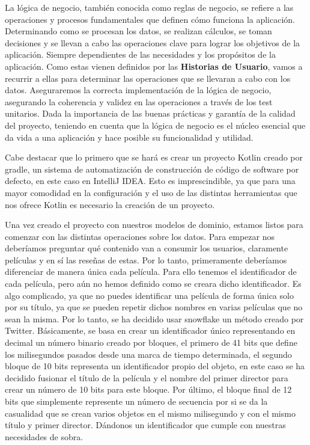 La lógica de negocio, también conocida como reglas de negocio, se refiere a las operaciones y procesos 
fundamentales que definen cómo funciona la aplicación. Determinando como se procesan los datos, se 
realizan cálculos, se toman decisiones y se llevan a cabo las operaciones clave para lograr los 
objetivos de la aplicación. Siempre dependientes de las necesidades y los propósitos de la aplicación. 
Como estas vienen definidos por las \textbf{Historias de Usuario}, vamos a recurrir a ellas para 
determinar las operaciones que se llevaran a cabo con los datos. Aseguraremos la correcta 
implementación de la lógica de negocio, asegurando la coherencia y validez en las operaciones a través 
de los test unitarios. Dada la importancia de las buenas prácticas y garantía de la calidad del 
proyecto, teniendo en cuenta que la lógica de negocio es el núcleo esencial que da vida a una 
aplicación y hace posible su funcionalidad y utilidad.

Cabe destacar que lo primero que se hará es crear un proyecto Kotlin creado por gradle, un sistema de 
automatización de construcción de código de software por defecto, en este caso en IntelliJ IDEA. Esto 
es imprescindible, ya que para una mayor comodidad en la configuración y el uso de las distintas 
herramientas que nos ofrece Kotlin es necesario la creación de un proyecto. 

Una vez creado el proyecto con nuestros modelos de dominio, estamos listos para comenzar con las 
distintas operaciones sobre los datos. Para empezar nos deberíamos preguntar qué contenido van a 
consumir los usuarios, claramente películas y en sí las reseñas de estas. Por lo tanto, primeramente 
deberíamos diferenciar de manera única cada película. Para ello tenemos el identificador de cada 
película, pero aún no hemos definido como se creara dicho identificador. Es algo complicado, ya que no 
puedes identificar una película de forma única solo por su título, ya que se pueden repetir dichos 
nombres en varias películas que no sean la misma. Por lo tanto, se ha decidido usar snowflake 
\cite{snowF} un método creado por Twitter. Básicamente, se basa en crear un identificador único 
representando en decimal un número binario creado por bloques, el primero de 41 bits que define los 
milisegundos pasados desde una marca de tiempo determinada, el segundo bloque de 10 bits representa un 
identificador propio del objeto, en este caso se ha decidido fusionar el título de la película y el 
nombre del primer director para crear un número de 10 bits para este bloque. Por último, el bloque 
final de 12 bits que simplemente represente un número de secuencia por si se da la casualidad que se 
crean varios objetos en el mismo milisegundo y con el mismo título y primer director. Dándonos un 
identificador que cumple con nuestras necesidades de sobra.

